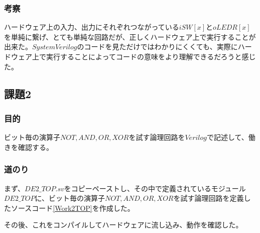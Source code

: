 \documentclass[a4paper]{jarticle}
\begin{document}
\subsubsection{考察}
ハードウェア上の入力、出力にそれぞれつながっている$iSW[x]$と$oLEDR[x]$を単純に繋げ、とても単純な回路だが、正しくハードウェア上で実行することが出来た。$System Verilog$のコードを見ただけではわかりにくくても、実際にハードウェア上で実行することによってコードの意味をより理解できるだろうと感じた。
\subsection{課題2}
\subsubsection{目的}
ビット毎の演算子$NOT,AND,OR,XOR$を試す論理回路を$Verilog$で記述して、働きを確認する。
\subsubsection{道のり}
まず、$DE2\_TOP.sv$をコピーペーストし、その中で定義されているモジュール$DE2\_TOP$に、ビット毎の演算子$NOT,AND,OR,XOR$を試す論理回路を定義したソースコード\ref{Work2TOP}を作成した。

その後、これをコンパイルしてハードウェアに流し込み、動作を確認した。
\end{document}

